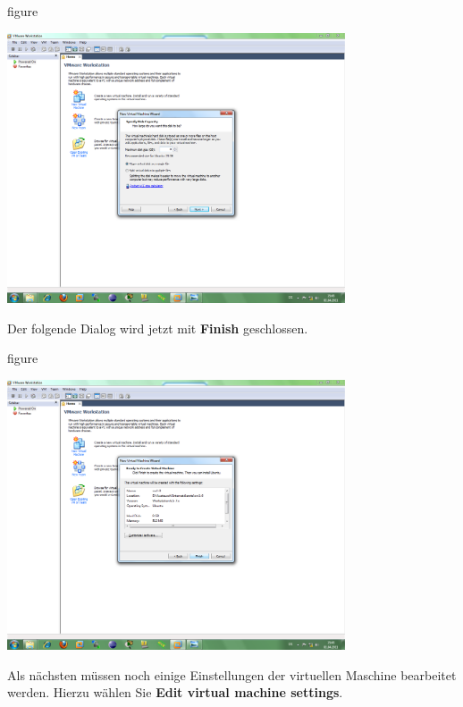 \begin{nofloat}{figure}
\begin{center}
\includegraphics[width=0.75\textwidth]{screenshots/vm06.png}
\end{center}
\end{nofloat}

Der folgende Dialog wird jetzt mit \textbf{Finish} geschlossen.

\begin{nofloat}{figure}
\begin{center}
\includegraphics[width=0.75\textwidth]{screenshots/vm07.png}
\end{center}
\end{nofloat}

Als nächsten müssen noch einige Einstellungen der virtuellen Maschine bearbeitet werden. Hierzu wählen Sie
\textbf{Edit virtual machine settings}.

